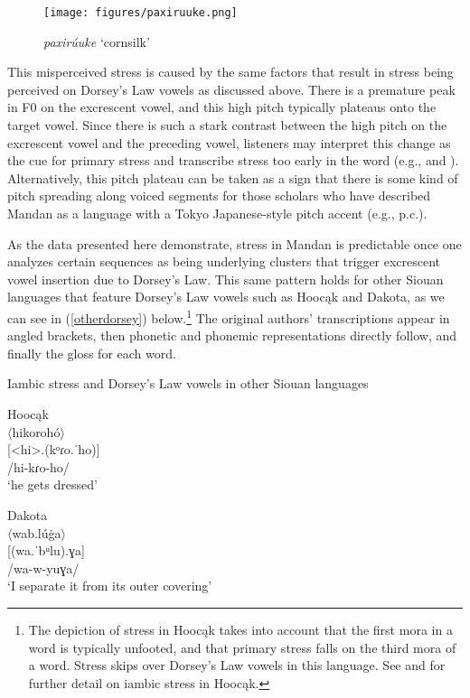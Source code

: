 \begin{figure}
\caption{\textit{paxirúuke} `cornsilk'}\label{paxiruuke}
\texttt{[image: figures/paxiruuke.png]}
\end{figure}

This misperceived stress is caused by the same factors that result in stress being perceived on Dorsey's Law vowels as discussed above. There is a premature peak in F0 on the excrescent vowel, and this high pitch typically plateaus onto the target vowel. Since there is such a stark contrast between the high pitch on the excrescent vowel and the preceding vowel, listeners may interpret this change as the cue for primary stress and transcribe stress too early in the word (e.g., \citealt{kennard1936} and \citealt{hollow1970}). Alternatively, this pitch plateau can be taken as a sign that there is some kind of pitch spreading along voiced segments for those scholars who have described Mandan as a language with a Tokyo Japanese-style pitch accent (e.g., \citeauthor{park2012} p.c.).

As the data presented here demonstrate, stress in Mandan is predictable once one analyzes certain sequences as being underlying clusters that trigger excrescent vowel insertion due to Dorsey's Law. This same pattern holds for other Siouan languages that feature Dorsey's Law vowels such as Hoocąk and Dakota, as we can see in (\ref{otherdorsey}) below.\footnote{The depiction of stress in Hoocąk takes into account that the first mora in a word is typically unfooted, and that primary stress falls on the third mora of a word. Stress skips over Dorsey's Law vowels in this language. See \citet{miner1979,miner1981} and \citet{halewhiteeagle1980} for further detail on iambic stress in Hoocąk.} The original authors' transcriptions appear in angled brackets, then phonetic and phonemic representations directly follow, and finally the gloss for each word.



\begin{exe}
\item\label{otherdorsey} Iambic stress and Dorsey's Law vowels in other Siouan languages

    \begin{xlist}
    \item\label{otherdorsey1} Hoocąk \\
    $\langle$hikorohó$\rangle$\\
    {[}<hi>.(kᵒɾo.ˈho)]\\
    /hi-kɾo-ho/\\
    `he gets dressed' \citep[128]{halewhiteeagle1980}

    \item\label{otherdorsey2} Dakota \\
    $\langle$wab.lúġa$\rangle$\\
    {[}(wa.ˈbᵘlu).ɣa]\\
    /wa-w-yuɣa/\\
    `I separate it from its outer covering' \citep[9]{boasdeloria1941}

	\end{xlist}
\end{exe}

